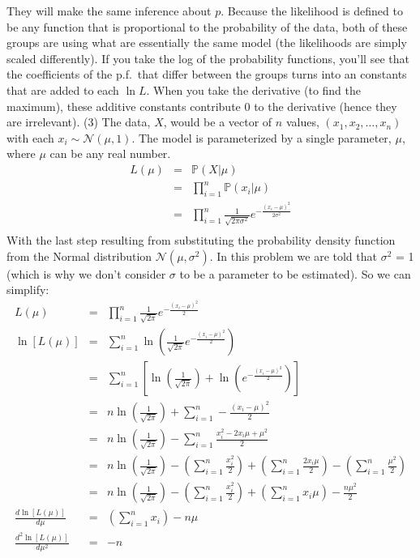 \documentclass[11pt]{article}
\renewcommand{\Pr}{{\mathbb P}}
\begin{document}
They will make the same inference about $p$. Because the likelihood is defined to be any function that is proportional to the probability of the data, both of these groups are using what are essentially the same model (the likelihoods are simply scaled differently).
If you take the log of the probability functions, you'll see that the coefficients of the p.f.~that differ between the groups turns into an constants that are added to each $\ln L$.
When you take the derivative (to find the maximum), these additive constants contribute 0 to the derivative (hence they are irrelevant).
\newpage
(3) The data, $X$, would be a vector of $n$ values, $(x_1, x_2, \ldots, x_n)$ with each $x_i \sim \mathcal{N}(\mu, 1)$.
The model is parameterized by a single parameter, $\mu$, where $\mu$ can be any real number.
\begin{eqnarray*}
	L(\mu) & = &\Pr(X|\mu) \\
		& = & \prod_{i=1}^{n}\Pr(x_i|\mu)\\
		& = & \prod_{i=1}^{n}\frac{1}{\sqrt{2\pi\sigma^2}}e^{-\frac{(x_i-\mu)^2}{2\sigma^2}} \\
\end{eqnarray*}
With the last step resulting from substituting the probability density function from the Normal distribution $\mathcal{N}(\mu, \sigma^2)$. 
In this problem we are told that $\sigma^2$ = 1 (which is why we don't consider $\sigma$ to be a parameter to be estimated). So we can simplify:
\begin{eqnarray*}
	L(\mu) & = & \prod_{i=1}^{n}\frac{1}{\sqrt{2\pi}}e^{-\frac{(x_i-\mu)^2}{2}} \\
	\ln [L(\mu)] & = & \sum_{i=1}^{n}\ln\left(\frac{1}{\sqrt{2\pi}}e^{-\frac{(x_i-\mu)^2}{2}}\right) \\
	& = & \sum_{i=1}^{n}\left[\ln\left(\frac{1}{\sqrt{2\pi}}\right)+\ln\left(e^{-\frac{(x_i-\mu)^2}{2}}\right)\right] \\
	& = & n\ln\left(\frac{1}{\sqrt{2\pi}}\right) + \sum_{i=1}^{n}-\frac{(x_i-\mu)^2}{2} \\
	& = & n\ln\left(\frac{1}{\sqrt{2\pi}}\right) - \sum_{i=1}^{n}\frac{x_i^2-2x_i\mu+\mu^2}{2} \\
	& = & n\ln\left(\frac{1}{\sqrt{2\pi}}\right) - \left(\sum_{i=1}^{n}\frac{x_i^2}{2}\right) + \left(\sum_{i=1}^{n}\frac{2x_i\mu}{2}\right) - \left(\sum_{i=1}^{n}\frac{\mu^2}{2}\right) \\
	& = & n\ln\left(\frac{1}{\sqrt{2\pi}}\right) - \left(\sum_{i=1}^{n}\frac{x_i^2}{2}\right) + \left(\sum_{i=1}^{n}x_i\mu\right) - \frac{n\mu^2}{2} \\
	\frac{d\ln [L(\mu)]}{d\mu} & = & \left(\sum_{i=1}^{n}x_i\right) - n\mu\\
	\frac{d^2\ln [L(\mu)]}{d\mu^2} & = & - n\\
\end{eqnarray*}
\end{document}
